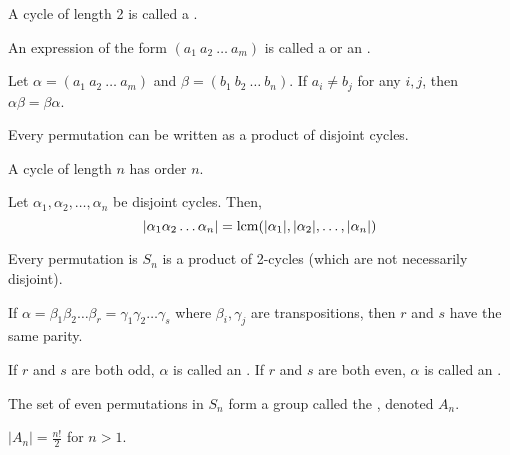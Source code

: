\documentclass[11pt,letterpaper]{jacky}
\begin{document}
\begin{defi}
    A cycle of length 2 is called a .
\end{defi}

\begin{defi}
    An expression of the form $(a_1\ a_2\ \ldots\ a_m)$ is called a  or an .
\end{defi}

\begin{prop}
    Let $\alpha=(a_1\ a_2\ \ldots\ a_m)$ and $\beta=(b_1\ b_2\ \ldots\ b_n)$. If $a_i\ne b_j$ for any $i,j$, then $\alpha\beta=\beta\alpha$.
\end{prop}

\begin{prop}
    Every permutation can be written as a product of disjoint cycles.
\end{prop}

\begin{prop}
    A cycle of length $n$ has order $n$.
\end{prop}

\begin{prop}
    Let $\alpha_1,\alpha_2,\ldots,\alpha_n$ be disjoint cycles. Then,
    $$|\alpha_1\alpha_2\ldots\alpha_n|=\operatorname{lcm}(|\alpha_1|,|\alpha_2|,\ldots,|\alpha_n|)$$
\end{prop}

\begin{prop}
    Every permutation is $S_n$ is a product of 2-cycles (which are not necessarily disjoint).
\end{prop}

\begin{prop}
    If $\alpha=\beta_1\beta_2\ldots\beta_r=\gamma_1\gamma_2\ldots\gamma_s$ where $\beta_i,\gamma_j$ are transpositions, then $r$ and $s$ have the same parity.
\end{prop}

\begin{defi}
    If $r$ and $s$ are both odd, $\alpha$ is called an . If $r$ and $s$ are both even, $\alpha$ is called an .
\end{defi}

\begin{defi}
    The set of even permutations in $S_n$ form a group called the , denoted $A_n$.
\end{defi}

\begin{note}
    $|A_n|=\frac{n!}{2}$ for $n>1$.
\end{note}
\end{document}
